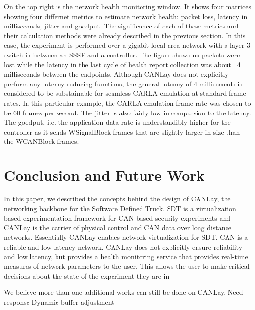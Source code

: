 \documentclass[letterpaper,twocolumn,12pt]{article}
\begin{document}
On the top right is the network health monitoring window. It shows four matrices showing
four differnet metrics to estimate network health: packet loss, latency in milliseconds, jitter and goodput. The significance of each of these metrics and their calculation methods were already described in the previous section. In this case, the experiment is performed over a gigabit local area network with a layer 3 switch in between an SSSF and a controller. The figure shows no packets were lost while the latency in the last cycle of health report collection was about ~4 milliseconds between the endpoints. Although CANLay does not explicitly perform any latency reducing functions, the general latency of 4 milliseconds is considered to be substainable for seamless CARLA emulation at standard frame rates. In this particular example, the CARLA emulation frame rate was chosen to be 60 frames per second. The jitter is also fairly low in comparsion to the latency. The goodput, i.e. the application data rate is understandibly higher for the controller as it sends WSignalBlock frames that are slightly larger in size than the WCANBlock frames. 

\section{Conclusion and Future Work}
In this paper, we described the concepts behind the design of CANLay, the networking backbone for the Software Defined Truck. SDT is a virtualization based experimentation framework for CAN-based security experiments and CANLay is the carrier of physical control and CAN data over long distance networks. Essentially CANLay enables network virtualization for SDT. CAN is a reliable and low-latency network. CANLay does not explicitly ensure reliability and low latency, but provides a health monitoring service that provides real-time measures of network parameters to the user. This allows the user to make critical decisions about the state of the experiment they are in.

We believe more than one additional works can still be done on CANLay. 
Need response
Dynamic buffer adjustment
 



\end{document}
